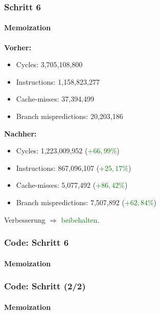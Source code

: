 \documentclass{beamer}
\newcommand{\success}[1]{\textcolor{green}{#1}}
\begin{document}
  \begin{frame}
  	\frametitle{Schritt 6}
  	\framesubtitle{Memoization}
  	\textbf{Vorher:}
		\begin{itemize}
			\item Cycles: 3,705,108,800 \\
			\item Instructions: 1,158,823,277\\
			\item Cache-misses: 37,394,499\\
			\item Branch mispredictions: 20,203,186\\
		\end{itemize}		
				
		\textbf{Nachher:}
		\begin{itemize}
			\item Cycles: 1,223,009,952 (\success{$+ 66,99\%$})\\
			\item Instructions: 867,096,107 (\success{$+ 25,17\%$})\\
			\item Cache-misses: 5,077,492 (\success{$+ 86,42\%$})\\
			\item Branch mispredictions: 7,507,892 (\success{$+ 62,84\%$})\\
		\end{itemize}	
		Verbesserung $\Rightarrow$ \success{beibehalten}.
  \end{frame}    
  
  \begin{frame}
  	\frametitle{Code: Schritt 6}
  	\framesubtitle{Memoization}
		\sMemo
  \end{frame}
  
  \begin{frame}
  	\frametitle{Code: Schritt (2/2)}
  	\framesubtitle{Memoization}
  	\sMemoMain
  \end{frame}
  
\end{document}
